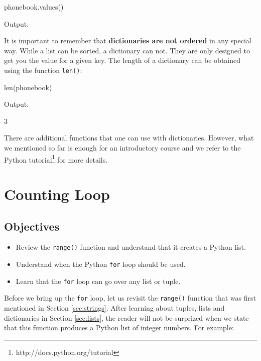 \begin{bluecode}
phonebook.values()
\end{bluecode}
Output:

\begin{bluecode}
[6784346, 1122345, 1234567]
\end{bluecode}
It is important to remember that {\bf dictionaries are not ordered} in any 
special way. While a list can be sorted, a dictionary can not. They are only 
designed to get you the value for a given key. 
The length of a dictionary can be obtained using the function {\tt len()}:

\begin{bluecode}
len(phonebook)
\end{bluecode}
Output:

\begin{bluecode}
3
\end{bluecode}
There are additional functions that one can use with dictionaries. However, 
what we mentioned so far is enough for an introductory course and we refer 
to the Python tutorial\footnote{http://docs.python.org/tutorial} for more 
details.


\section{Counting Loop} \label{sec:forloop}

\subsection{Objectives}

\begin{itemize}
\item Review the {\tt range()} function and understand that it creates a Python list.
\item Understand when the Python {\tt for} loop should be used.
\item Learn that the {\tt for} loop can go over any list or tuple.
\end{itemize}
Before we bring up the {\tt for} loop, let us revisit the {\tt range()}
function that was first mentioned in Section \ref{sec:strings}. After 
learning about tuples, lists and dictionaries in Section \ref{sec:lists}, the 
reader will not be surprized when we state that this function produces 
a Python list of integer numbers. For example:

